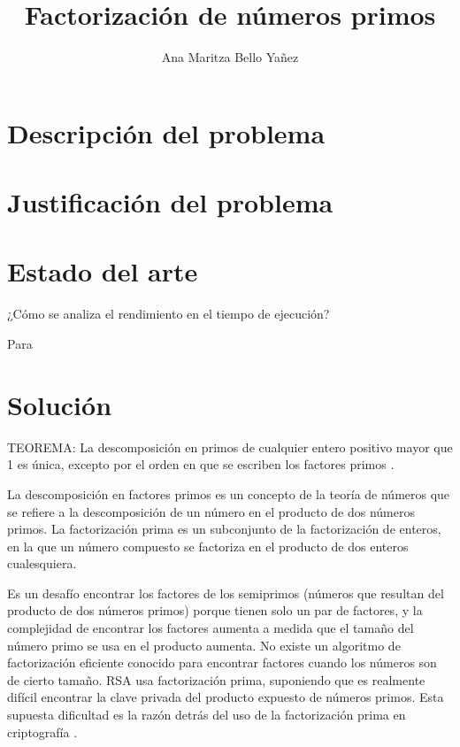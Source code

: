 \documentclass{article}
\begin{document}
\title{Factorización de números primos}
\author{Ana Maritza Bello Yañez}
\maketitle

\section{Descripción del problema}

\section{Justificación del problema}

\section{Estado del arte}

¿Cómo se analiza el rendimiento en el tiempo de ejecución?

Para 


\section{Solución}



TEOREMA:
La descomposición en primos de cualquier entero positivo mayor que 1 es única,
excepto por el orden en que se escriben los factores primos \cite{lewinter2015elementary}.

La descomposición en factores primos es un concepto de la teoría de números que
se refiere a la descomposición de un número en el producto de dos números
primos. La factorización prima es un subconjunto de la factorización de enteros,
en la que un número compuesto se factoriza en el producto de dos enteros
cualesquiera.

Es un desafío encontrar los factores de los semiprimos (números que resultan del
producto de dos números primos) porque tienen solo un par de factores, y la
complejidad de encontrar los factores aumenta a medida que el tamaño del número
primo se usa en el producto aumenta. No existe un algoritmo de factorización
eficiente conocido para encontrar factores cuando los números son de cierto
tamaño. RSA usa factorización prima, suponiendo que es realmente difícil
encontrar la clave privada del producto expuesto de números primos. Esta
supuesta dificultad es la razón detrás del uso de la factorización prima en
criptografía \cite{raj2019foundations}.
\end{document}
